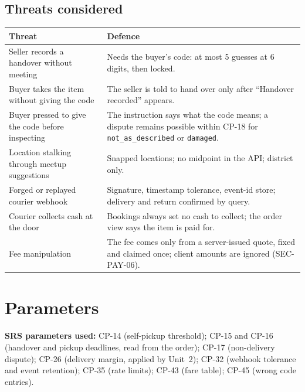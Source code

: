 \documentclass[11pt,a4paper]{article}
\newenvironment{dtable}[1]{\small\begin{longtable}{#1}}{\end{longtable}}
\begin{document}
\subsection{Threats considered}
\begin{dtable}{@{}>{\raggedright\arraybackslash}p{4.6cm}>{\raggedright\arraybackslash}p{10.6cm}@{}}
\toprule
\textbf{Threat} & \textbf{Defence} \\ \midrule \endhead
Seller records a handover without meeting & Needs the buyer's code: at most 5 guesses at 6 digits, then locked. \\
Buyer takes the item without giving the code & The seller is told to hand over only after ``Handover recorded'' appears. \\
Buyer pressed to give the code before inspecting & The instruction says what the code means; a dispute remains possible within CP-18 for \texttt{not\_as\_described} or \texttt{damaged}. \\
Location stalking through meetup suggestions & Snapped locations; no midpoint in the API; district only. \\
Forged or replayed courier webhook & Signature, timestamp tolerance, event-id store; delivery and return confirmed by query. \\
Courier collects cash at the door & Bookings always set no cash to collect; the order view says the item is paid for. \\
Fee manipulation & The fee comes only from a server-issued quote, fixed and claimed once; client amounts are ignored (SEC-PAY-06). \\
\bottomrule
\end{dtable}

\section{Parameters}
\textbf{SRS parameters used:} CP-14 (self-pickup threshold); CP-15 and CP-16 (handover and pickup deadlines, read from the order); CP-17 (non-delivery dispute); CP-26 (delivery margin, applied by Unit~2); CP-32 (webhook tolerance and event retention); CP-35 (rate limits); CP-43 (fare table); CP-45 (wrong code entries).
\end{document}
